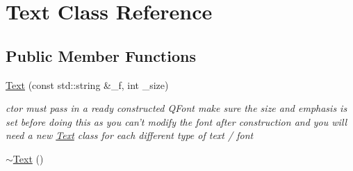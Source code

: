 \hypertarget{classText}{
\section{Text Class Reference}
\label{classText}
}
\subsection*{Public Member Functions}
\begin{DoxyCompactItemize}
\item 
\hyperlink{classText_a5454ef14fc670f5ef68bdbe2fe2fad3b}{Text} (const std::string \&\_\-f, int \_\-size)
\begin{DoxyCompactList}\small\item\em ctor must pass in a ready constructed QFont make sure the size and emphasis is set before doing this as you can't modify the font after construction and you will need a new \hyperlink{classText}{Text} class for each different type of text / font \item\end{DoxyCompactList}\item 
\hypertarget{classText_a2d49e5c280e205125b149f7777ae30c7}{
\hyperlink{classText_a2d49e5c280e205125b149f7777ae30c7}{$\sim$Text} ()}
\label{classText_a2d49e5c280e205125b149f7777ae30c7}


\end{DoxyCompactItemize}
